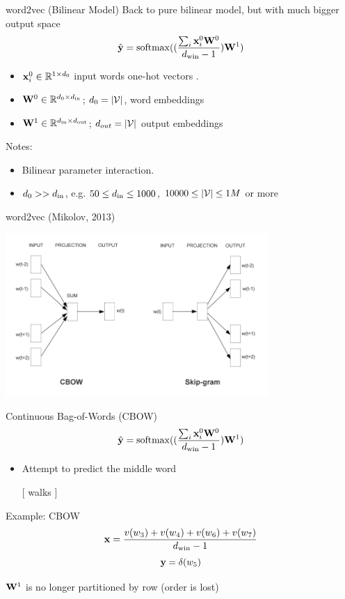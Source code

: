 \documentclass{beamer}
\newlength\matfield
\newlength\tmplength
\def\matscale{1.}
\newcommand\dimbox[3]{%
  \setlength\matfield{\matscale\baselineskip}%
  \setbox0=\hbox{\vphantom{X}\smash{#3}}%
  \setlength{\tmplength}{#1\matfield-\ht0-\dp0}%
  \fboxrule=1pt\fboxsep=-\fboxrule\relax%
  \fbox{\makebox[#2\matfield]{\addstackgap[.5\tmplength]{\box0}}}%
}
\newcommand\matbox[4]{
  \stackunder{\dimbox{#1}{#2}{$#4$}}{\scriptstyle #3}%
}
\begin{document}
\begin{frame}{word2vec (Bilinear Model)}
  Back to pure bilinear model, but with much bigger output space
  \[\hat{\boldy} = \softmax((\frac{\sum_{i} \boldx_i^0 \boldW^0}{\dwin-1}) \boldW^1)\]
  \begin{itemize}
  \item $\mathbf{x}^0_i \in \mathbb{R}^{1 \times d_0}$ input words one-hot vectors .
  \item $\mathbf{W}^0 \in \mathbb{R}^{d_0 \times {d_{\mathrm{in}}}}$; $d_0 = |\mathcal{V}|$, word embeddings
  \item $\mathbf{W}^1 \in \mathbb{R}^{{d_{\mathrm{in}}} \times {d_{\mathrm{out}}}}$; $d_{out} = |\mathcal{V}|$ output embeddings
  \end{itemize}
  \air
  Notes:
  \begin{itemize}
  \item Bilinear parameter interaction.
  \item $d_0 >> {d_{\mathrm{in}}}$, e.g.  $50 \leq {d_{\mathrm{in}}} \leq 1000$, $10000 \leq |\mathcal{V}| \leq 1M$ or more
  \end{itemize}
\end{frame}

\begin{frame}{word2vec (Mikolov, 2013)}
  \begin{center}
    \includegraphics[width=10cm]{word2vec}
  \end{center}
\end{frame}

\begin{frame}{Continuous Bag-of-Words (CBOW) }
  \[\hat{\boldy} = \softmax((\frac{\sum_{i} \boldx_i^0 \boldW^0}{\dwin-1})\boldW^1)\]
  \begin{itemize}

  \item Attempt to predict the middle word
    \begin{center}
      [  \alert{walks}  ]
    \end{center}
  \end{itemize}

  Example: CBOW
  \[ \mathbf{x} = \frac{v(w_3) +  v(w_4) +   v(w_6) + v(w_7)}{{d_{\mathrm{win}}}-1}  \]
  \[ \mathbf{y} = \delta(w_5) \]


  $\mathbf{W}^1$ is no longer partitioned by row (order is lost)
\end{frame}
\end{document}
